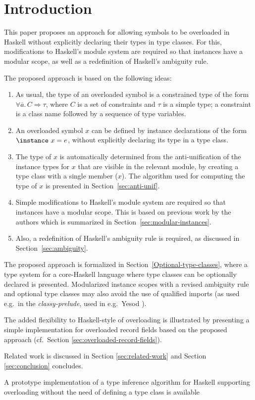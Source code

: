 \section{Introduction}
\label{sec:intro}

This paper proposes an approach for allowing symbols to be overloaded
in Haskell without explicitly declaring their types in type
classes. For this, modifications to Haskell's module system are
required so that instances have a modular scope, as well as a
redefinition of Haskell's ambiguity rule.

The proposed approach is based on the following ideas:

\begin{enumerate}

 \item As usual, the type of an overloaded symbol is a constrained
   type of the form $\forall \overline{a}.\,C \Rightarrow \tau$, where
   $C$ is a set of constraints and $\tau$ is a simple type; a
   constraint is a class name followed by a sequence of type
   variables.

\item An overloaded symbol $x$ can be defined by instance declarations
  of the form $\instance\ x=e$, without explicitly declaring its type
  in a type class.

\item The type of $x$ is automatically determined from the
  anti-unification of the instance types for $x$ that are visible in
  the relevant module, by creating a type class with a single member
  ($x$). The algorithm used for computing the type of $x$ is presented
  in Section~\ref{sec:anti-unif}.

\item Simple modifications to Haskell's module system are required so
  that instances have a modular scope. This is based on previous work
  by the authors which is summarized in
  Section~\ref{sec:modular-instances}.

\item Also, a redefinition of Haskell's ambiguity rule is required, as
  discussed in Section~\ref{sec:ambiguity}.

\end{enumerate}

The proposed approach is formalized in
Section~\ref{Optional-type-classes}, where a type system for a
core-Haskell language where type classes can be optionally declared is
presented. Modularized instance scopes with a revised ambiguity rule
and optional type classes may also avoid the use of qualified imports
(as used e.g.~in the {\em classy-prelude}, used in e.g.~Yesod
\cite{Yesod}).

The added flexibility to Haskell-style of overloading is illustrated
by presenting a simple implementation for overloaded record fields
based on the proposed approach (cf.~Section
\ref{sec:overloaded-record-fields}).

Related work is discussed in Section \ref{sec:related-work} and
Section \ref{sec:conclusion} concludes.

A prototype implementation of a type inference algorithm for Haskell supporting
overloading without the need of defining a type class is available~\cite{opt-rep}
